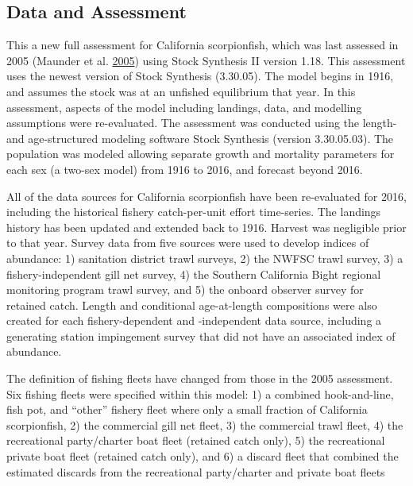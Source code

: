 \documentclass[12pt,]{article}
\begin{document}
\FloatBarrier

\newpage

\subsection*{Data and Assessment}\label{data-and-assessment}

This a new full assessment for California scorpionfish, which was last
assessed in 2005 (Maunder et al.
\protect\hyperlink{ref-Maunder2005}{2005}) using Stock Synthesis II
version 1.18. This assessment uses the newest version of Stock Synthesis
(3.30.05). The model begins in 1916, and assumes the stock was at an
unfished equilibrium that year. In this assessment, aspects of the model
including landings, data, and modelling assumptions were re-evaluated.
The assessment was conducted using the length- and age-structured
modeling software Stock Synthesis (version 3.30.05.03). The population
was modeled allowing separate growth and mortality parameters for each
sex (a two-sex model) from 1916 to 2016, and forecast beyond 2016.

All of the data sources for California scorpionfish have been
re-evaluated for 2016, including the historical fishery catch-per-unit
effort time-series. The landings history has been updated and extended
back to 1916. Harvest was negligible prior to that year. Survey data
from five sources were used to develop indices of abundance: 1)
sanitation district trawl surveys, 2) the NWFSC trawl survey, 3) a
fishery-independent gill net survey, 4) the Southern California Bight
regional monitoring program trawl survey, and 5) the onboard observer
survey for retained catch. Length and conditional age-at-length
compositions were also created for each fishery-dependent and
-independent data source, including a generating station impingement
survey that did not have an associated index of abundance.

The definition of fishing fleets have changed from those in the 2005
assessment.\\
Six fishing fleets were specified within this model: 1) a combined
hook-and-line, fish pot, and ``other'' fishery fleet where only a small
fraction of California scorpionfish, 2) the commercial gill net fleet,
3) the commercial trawl fleet, 4) the recreational party/charter boat
fleet (retained catch only), 5) the recreational private boat fleet
(retained catch only), and 6) a discard fleet that combined the
estimated discards from the recreational party/charter and private boat
fleets
\end{document}
